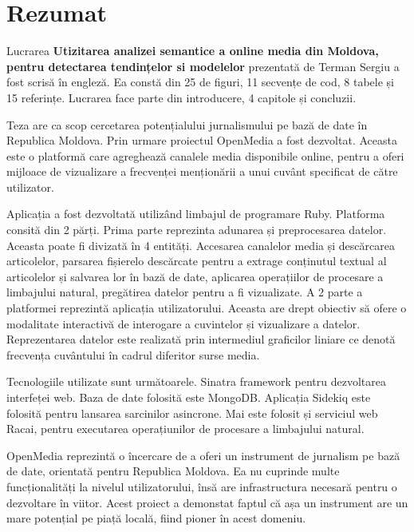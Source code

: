 \section*{Rezumat}
Lucrarea \textbf{Utizitarea analizei semantice a online media din Moldova, pentru detectarea tendințelor si modelelor} prezentată de Terman Sergiu a fost scrisă în engleză. Ea constă din 25 de figuri, 11 secvențe de cod, 8 tabele și 15 referințe. Lucrarea face parte din introducere, 4 capitole și concluzii.

Teza are ca scop cercetarea potențialului jurnalismului pe bază de date în Republica Moldova. Prin urmare proiectul OpenMedia a fost dezvoltat. Aceasta este o platformă care agreghează canalele media disponibile online, pentru a oferi mijloace de vizualizare a frecvenței menționării a unui cuvânt specificat de către utilizator.

Aplicația a fost dezvoltată utilizând limbajul de programare Ruby. Platforma consită din 2 părți. Prima parte reprezinta adunarea și preprocesarea datelor. Aceasta poate fi divizată în 4 entități. Accesarea canalelor media și descărcarea articolelor, parsarea fișierelo descărcate pentru a extrage conținutul textual al articolelor și salvarea lor în bază de date, aplicarea operațiilor de procesare a limbajului natural, pregătirea datelor pentru a fi vizualizate. A 2 parte a platformei reprezintă aplicația utilizatorului. Aceasta are drept obiectiv să ofere o modalitate interactivă de interogare a cuvintelor și vizualizare a datelor. Reprezentarea datelor este realizată prin intermediul graficilor liniare ce denotă frecvența cuvântului în cadrul diferitor surse media.

Tecnologiile utilizate sunt următoarele. Sinatra framework pentru dezvoltarea interfeței web. Baza de date folosită este MongoDB. Aplicația Sidekiq este folosită pentru lansarea sarcinilor asincrone. Mai este folosit și serviciul web Racai, pentru executarea operațiunilor de procesare a limbajului natural.


OpenMedia reprezintă o încercare de a oferi un instrument de jurnalism pe bază de date, orientată pentru Republica Moldova. Ea nu cuprinde multe funcționalități la nivelul utilizatorului, însă are infrastructura necesară pentru o dezvoltare în viitor. Acest proiect a demonstat faptul că așa un instrument are un mare potențial pe piață locală, fiind pioner în acest domeniu.
